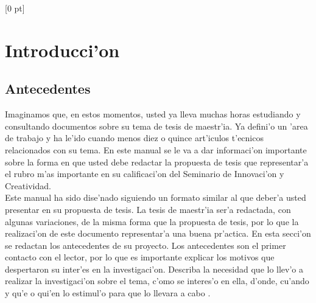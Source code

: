 \titlespacing{\chapter}{0 pt}{30 pt}{50 pt}[0 pt]
\titleformat{\section}{\Large\bfseries}{\thesection}{0 pt}{\hspace{30 pt}}
\titleformat{\subsection}{\large\bfseries}{\thesubsection}{0 pt}{\hspace{30 pt}}
\pagestyle{fancy}
\fancyhead[LO,LE]{\footnotesize\textit{\leftmark}}
\fancyhead[RO,RE]{\thepage}
\fancyfoot[CO,CE]{}

\chapter{Introducci'on} %

\normalsize

\section{Antecedentes}
\vspace{30 pt}
\noindent
Imaginamos que, en estos momentos, usted ya lleva muchas horas estudiando y consultando documentos sobre su tema de tesis de maestr'ia. Ya defini'o un 'area de trabajo y ha le'ido cuando menos diez o quince art'iculos t'ecnicos relacionados con su tema. En este manual se le va a dar informaci'on importante sobre la forma en que usted debe redactar la propuesta de tesis que representar'a el rubro m'as importante en su calificaci'on del Seminario de Innovaci'on y Creatividad.\\

Este manual ha sido dise'nado siguiendo un formato similar al que deber'a usted presentar en su propuesta de tesis. La tesis de maestr'ia ser'a redactada, con algunas variaciones, de la misma forma que la propuesta de tesis, por lo que la realizaci'on de este documento representar'a una buena pr'actica. En esta secci'on se redactan los antecedentes de su proyecto. Los antecedentes son el primer contacto con el lector, por lo que es importante explicar los motivos que despertaron su inter'es en la investigaci'on. Describa la necesidad que lo llev'o a realizar la investigaci'on sobre el tema, c'omo se interes'o en ella, d'onde, cu'ando y qu'e o qui'en lo estimul'o para que lo llevara a cabo \cite{Demo:tesis_autor}.

